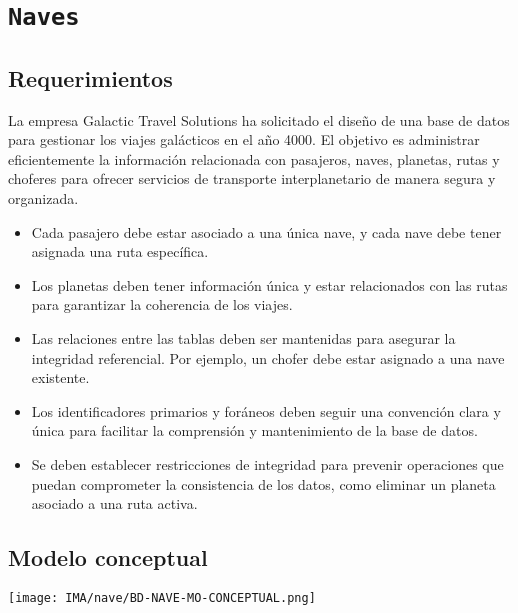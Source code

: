 \section{\texttt{Naves}}

\subsection{Requerimientos}

La empresa Galactic Travel Solutions ha solicitado el diseño de una base de datos para gestionar 
los viajes galácticos en el año 4000. El objetivo es administrar eficientemente la información relacionada 
con pasajeros, naves, planetas, rutas y choferes para ofrecer servicios de transporte 
interplanetario de manera segura y organizada.

\begin{itemize}
  \item Cada pasajero debe estar asociado a una única nave, y cada nave debe tener asignada una ruta específica.
  \item Los planetas deben tener información única y estar relacionados con las rutas para garantizar la coherencia de los viajes.
  \item Las relaciones entre las tablas deben ser mantenidas para asegurar la integridad referencial. Por ejemplo, un chofer debe estar asignado a una nave existente.
  \item Los identificadores primarios y foráneos deben seguir una convención clara y única para facilitar la comprensión y mantenimiento de la base de datos.
  \item Se deben establecer restricciones de integridad para prevenir operaciones que puedan comprometer la consistencia de los datos, como eliminar un planeta asociado a una ruta activa.
\end{itemize}

\subsection{Modelo conceptual}
\begin{center}
    \texttt{[image: IMA/nave/BD-NAVE-MO-CONCEPTUAL.png]}
\end{center}



